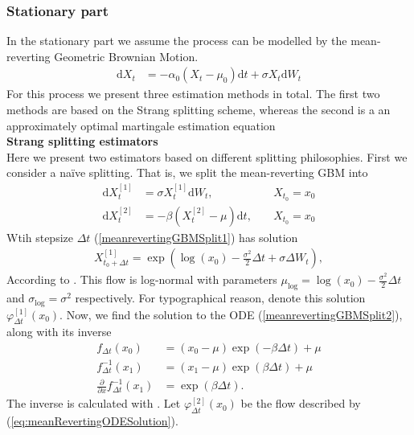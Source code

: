 \subsubsection{Stationary part}\label{subsubsec:meanrevertingGBMStationary}
In the stationary part we assume the process can be modelled by the mean-reverting Geometric Brownian Motion.
\begin{align}
    \mathrm{d}X_t &= -\alpha_0\left(X_t - \mu_0\right)\mathrm{d}t + \sigma X_t \mathrm{d}W_t
\end{align}
For this process we present three estimation methods in total. The first two methods are based on the Strang splitting scheme, whereas the second is a an approximately optimal martingale estimation equation \\
\noindent \textbf{Strang splitting estimators}\\
Here we present two estimators based on different splitting philosophies. First we consider a naïve splitting. That is, we split the mean-reverting GBM into
\begin{align}
    \mathrm{d}X_t^{[1]} &= \sigma X_t^{[1]}\mathrm{d}W_t, \; &&X_{t_0} = x_0 \label{meanrevertingGBMSplit1}\\
    \mathrm{d}X_t^{[2]} &= -\beta\left(X_t^{[2]} - \mu\right)\mathrm{d}t, \; &&X_{t_0} = x_0 \label{meanrevertingGBMSplit2}
\end{align}
Wtih stepsize $\Delta t$ (\ref{meanrevertingGBMSplit1}) has solution
\begin{align}
    X_{t_0 + \Delta t}^{[1]} = \exp\left(\log(x_0) -\frac{\sigma^2}{2}\Delta t + \sigma \Delta W_t\right),
\end{align}
According to \cite[example 4.7]{Srkk2019}. This flow is log-normal with parameters $\mu_{\mathrm{log}} = \log(x_0) -\frac{\sigma^2}{2}\Delta t$ and $\sigma_{\log} = \sigma^2$ respectively. For typographical reason, denote this solution $\varphi_{\Delta t}^{[1]}(x_0)$. Now, we find the solution to the ODE (\ref{meanrevertingGBMSplit2}), along with its inverse 
\begin{align}
    f_{\Delta t}(x_0) &= (x_0 - \mu)\exp(-\beta\Delta t) + \mu \label{eq:meanRevertingODESolution}\\
    f_{\Delta t}^{-1}(x_1) &=  (x_1 - \mu)\exp(\beta\Delta t) + \mu\\
    \frac{\partial}{\partial x} f_{\Delta t}^{-1}(x_1) &= \exp\left(\beta\Delta t\right).
\end{align}
The inverse is calculated with \cite[remark belown equation (9)]{SplittingSchemes}. Let $\varphi_{\Delta t}^{[2]}(x_0)$ be the flow described by (\ref{eq:meanRevertingODESolution}).
